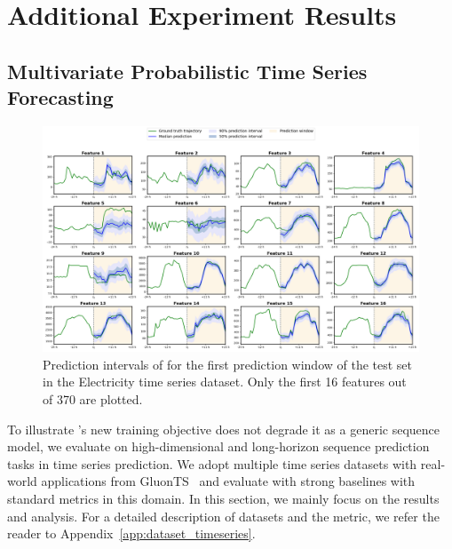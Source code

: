 
\section{Additional Experiment Results }
\label{app:exp_timeseries}
\subsection{Multivariate Probabilistic Time Series Forecasting} \label{appendix:ts}

\begin{figure}
    \centering
    \includegraphics[width=\textwidth]{figures/ts_electricity.png}
    \caption{Prediction intervals of \algo{} for the first prediction window of the test set in the Electricity time series dataset. Only the first 16 features out of 370 are plotted.}
    \label{fig:ts_results}
\end{figure}
To illustrate \algo's new training objective does not degrade it as a generic sequence model, we evaluate \algo{} on high-dimensional and long-horizon sequence prediction tasks in time series prediction. We adopt multiple time series datasets with real-world applications from GluonTS~\cite{gluonts} and evaluate \algo{} with strong baselines with standard metrics in this domain. In this section, we mainly focus on the results and analysis. For a detailed description of datasets and the metric, we refer the reader to Appendix~\ref{app:dataset_timeseries}.


